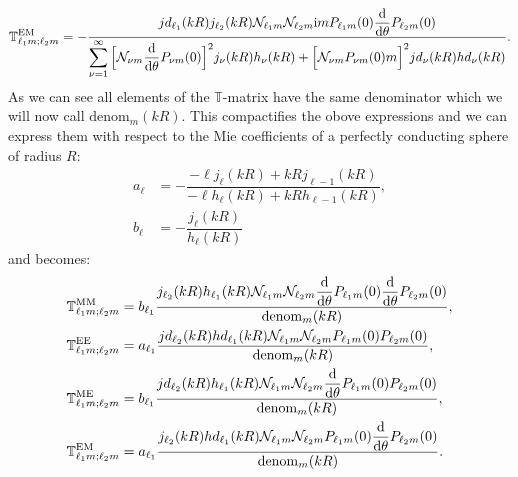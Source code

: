 \begin{equation}
\mathbb{T}^\mathrm{EM}_{\ell_1 m;\ell_2 m} = -
\frac{jd_{\ell_1}(kR) j_{\ell_2}(kR)
\mathcal{N}_{\ell_1 m}\mathcal{N}_{\ell_2 m}
\mathrm{i} mP_{\ell_1 m}(0)\dfrac{\mathrm{d}}{\mathrm{d} \theta}P_{\ell_2 m}(0)
}{\displaystyle \sum_{\nu=1}^\infty
\Big[
\mathcal{N}_{\nu m} \frac{\mathrm{d}}{\mathrm{d} \theta}P_{\nu m}(0)
\Big]^2 j_\nu(kR) h_\nu(kR)
+
\Big[
\mathcal{N}_{\nu m} P_{\nu m}(0) m
\Big]^2jd_\nu(kR) hd_\nu(kR)
}.
\end{equation}
As we can see all elements of the $\mathbb{T}$-matrix have the same denominator which we will now call $\mathrm{denom}_m(kR)$. This compactifies the obove expressions and we can express them with respect to the Mie coefficients of a perfectly conducting sphere of radius $R$:
\begin{align}
a_{\ell} &= -\dfrac{-\ell j_\ell(kR)+kR j_{\ell-1}(kR)}{-\ell h_\ell(kR)+kRh_{\ell-1}(kR)},\\
b_{\ell} &= -\dfrac{j_\ell(kR)}{h_\ell(kR)}
\end{align}
and becomes:
\begin{align}
\mathbb{T}^\mathrm{MM}_{\ell_1 m;\ell_2 m} &= b_{\ell_1} \frac{
j_{\ell_2}(kR)h_{\ell_1}(kR) \mathcal{N}_{\ell_1 m}\mathcal{N}_{\ell_2 m}
\dfrac{\mathrm{d}}{\mathrm{d} \theta}P_{\ell_1 m}(0)\dfrac{\mathrm{d}}{\mathrm{d} \theta} P_{\ell_2 m}(0)
}{
\mathrm{denom}_m(kR)
},\\
\mathbb{T}^\mathrm{EE}_{\ell_1 m;\ell_2 m} &= a_{\ell_1} \frac{
jd_{\ell_2}(kR)hd_{\ell_1}(kR) \mathcal{N}_{\ell_1 m}\mathcal{N}_{\ell_2 m}
P_{\ell_1 m}(0) P_{\ell_2 m}(0)
}{
\mathrm{denom}_m(kR)
},\\
\mathbb{T}^\mathrm{ME}_{\ell_1 m;\ell_2 m} &= b_{\ell_1} \frac{
jd_{\ell_2}(kR)h_{\ell_1}(kR) \mathcal{N}_{\ell_1 m}\mathcal{N}_{\ell_2 m}
\dfrac{\mathrm{d}}{\mathrm{d} \theta}P_{\ell_1 m}(0) P_{\ell_2 m}(0)
}{
\mathrm{denom}_m(kR)
},\\
\mathbb{T}^\mathrm{EM}_{\ell_1 m;\ell_2 m} &= a_{\ell_1} \frac{
j_{\ell_2}(kR)hd_{\ell_1}(kR) \mathcal{N}_{\ell_1 m}\mathcal{N}_{\ell_2 m}
P_{\ell_1 m}(0)\dfrac{\mathrm{d}}{\mathrm{d} \theta} P_{\ell_2 m}(0)
}{
\mathrm{denom}_m(kR)
}.
\end{align}